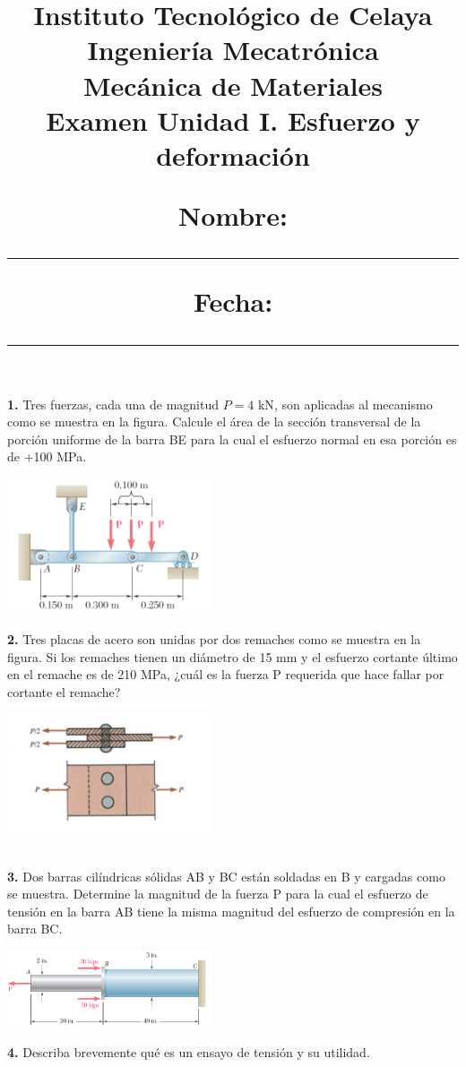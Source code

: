 \documentclass[12pt,letterpaper,twocolumn]{article}
\author{}
\date{}
\title{
\vspace{-20mm}
{\normalsize Instituto Tecnológico de Celaya} \\ [-3.5mm]
{\normalsize Ingeniería Mecatrónica} \\ [-3.5mm]
{\normalsize Mecánica de Materiales} \\ [-3.5mm]
{\bf\normalsize Examen Unidad I. Esfuerzo y deformación} \\ [2mm]
{\normalsize Nombre: \rule{8cm}{0.4pt} \hfill Fecha: \rule{3cm}{0.4pt} }
}
\newcommand{\puntos}[1]{ {\small\sffamily [#1 \%]} }
\begin{document}
\maketitle
\vspace{-20mm}

\textbf{1. } Tres fuerzas, cada una de magnitud $P = 4 \text{ kN}$, son aplicadas al mecanismo como 
se muestra en la figura. Calcule el área de la sección transversal de la porción uniforme de la barra 
BE para la cual el esfuerzo normal en esa porción es de +100 MPa. \puntos{30}

\begin{center}
\includegraphics[width=0.45\textwidth]{img/p01.PNG}
\end{center}


\textbf{2. } Tres placas de acero son unidas por dos remaches como se muestra en la figura. Si los remaches 
tienen un diámetro de 15 mm y el esfuerzo cortante último en el remache es de 210 MPa, ¿cuál es la fuerza 
P requerida que hace fallar por cortante el remache? \puntos{30}

\begin{center}
\includegraphics[width=0.45\textwidth]{img/p02.PNG}
\end{center}

\hfill \\

\textbf{3. } Dos barras cilíndricas sólidas AB y BC están soldadas en B y cargadas como se muestra. Determine 
la magnitud de la fuerza P para la cual el esfuerzo de tensión en la barra AB tiene la misma magnitud del 
esfuerzo de compresión en la barra BC. \puntos{30}

\begin{center}
\includegraphics[width=0.45\textwidth]{img/p03.PNG}
\end{center}

\textbf{4. } Describa brevemente qué es un ensayo de tensión y su utilidad. \puntos{10}
\end{document}
